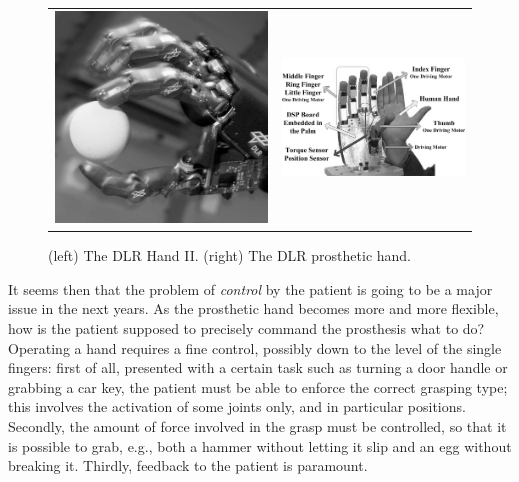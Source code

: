 \begin{figure}
  \begin{tabular}{cc}
    \includegraphics[height=0.12\textheight]{figs/DLRHand-Ball-comp.jpg} &
    \includegraphics[height=0.12\textheight]{figs/DLR-Prothese.jpg}
  \end{tabular}
  \caption{(left) The DLR Hand II. (right) The DLR prosthetic hand.}
  \label{fig:DLRHandII}
\end{figure}

It seems then that the problem of \emph{control} by the patient is
going to be a major issue in the next years. As the prosthetic hand
becomes more and more flexible, how is the patient supposed to
precisely command the prosthesis what to do? Operating a hand requires
a fine control, possibly down to the level of the single fingers:
first of all, presented with a certain task such as turning a door
handle or grabbing a car key, the patient must be able to enforce the
correct grasping type; this involves the activation of some joints
only, and in particular positions. Secondly, the amount of force
involved in the grasp must be controlled, so that it is possible to
grab, e.g., both a hammer without letting it slip and an egg without
breaking it. Thirdly, feedback to the patient is paramount.

